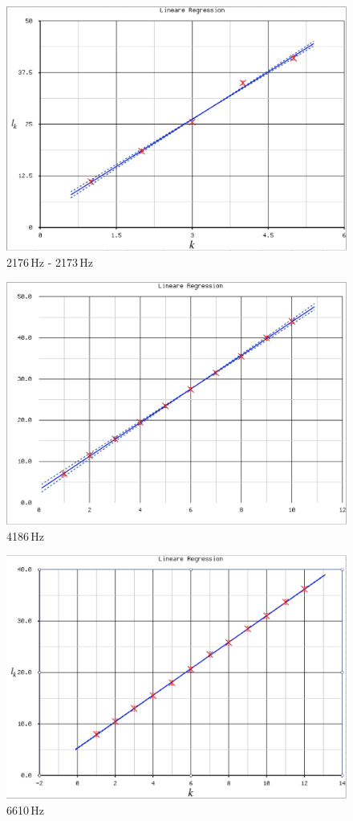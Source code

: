 \documentclass[11pt,a4paper]{article}
\begin{document}
\pagebreak

\begin{figure}
\centering
\includegraphics[width=.8\textwidth]{reg1}
\caption{2176\,Hz - 2173\,Hz}
\end{figure}

\begin{figure}
\centering
\includegraphics[width=.8\textwidth]{reg2}
\caption{4186\,Hz}
\end{figure}

\begin{figure}
\centering
\includegraphics[width=\textwidth]{reg3}
\caption{6610\,Hz}
\end{figure}
\end{document}
